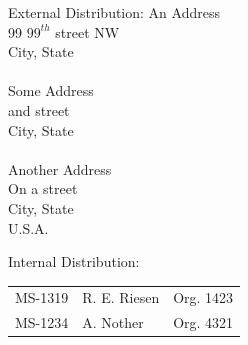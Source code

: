 \documentclass[pdf,ps2pdf,12pt]{smemo}
\begin{document}
\begin{memo}
% 
\clearpage
\begin{distribution}{External Distribution:}
    \normalfont
    An Address\\
    99 $99^{th}$ street NW\\
    City, State\\
    \\
    Some Address\\
    and street\\
    City, State\\
    \\
    Another Address\\
    On a street\\
    City, State\\
    U.S.A.
\end{distribution}

\begin{distribution}{Internal Distribution:}
    \normalfont
    \begin{tabular}{@{}lll}
	MS-1319 & R. E. Riesen & Org. 1423\\[3pt]
	MS-1234 & A. Nother & Org. 4321
    \end{tabular}
\end{distribution}

% 
\end{memo}
\end{document}
